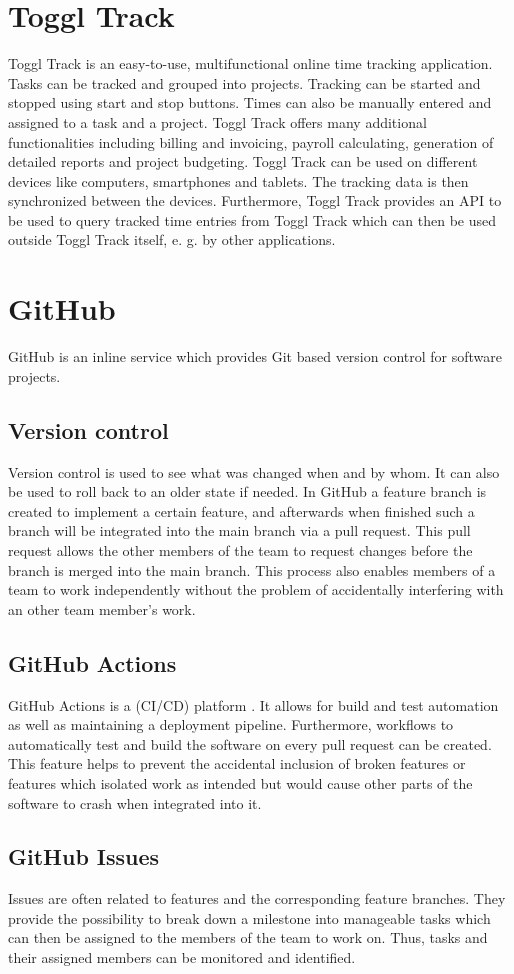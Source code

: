 \section{Toggl Track}
Toggl Track is an easy-to-use, multifunctional online time tracking application. Tasks can be tracked and grouped
into projects. Tracking can be started and stopped using start and stop buttons. Times can also be manually entered
and assigned to a task and a project. Toggl Track offers many additional functionalities including billing and invoicing,
payroll calculating, generation of detailed reports and project budgeting. Toggl Track can be used on different devices 
like computers, smartphones and tablets. The tracking data is then synchronized between the devices. Furthermore, Toggl 
Track provides an API to be used to query tracked time entries from Toggl Track which can then be used outside Toggl Track 
itself, e. g. by other applications. \cite{bachelorarbeit_Egger_Verstappen_page8} \cite{toggl_track_url}

\section{GitHub} \label{GitHub}
GitHub \cite{github_url} is an inline service which provides Git \cite{git_url} based version control for software projects.
\subsection{Version control} \label{Version control}
Version control is used to see what was changed when and by whom. It can also be used to roll back to an older state if needed. In GitHub a feature branch is created to implement a certain feature, and afterwards when finished such a branch will be integrated into the main branch via a pull request. This pull request allows the other members of the team to request changes before the branch is merged into the main branch. This process also enables members of a team to work independently without the problem of accidentally interfering with an other team member's work.
\subsection{GitHub Actions} \label{GitHub Actions}
GitHub Actions is a (CI/CD) platform \cite{github_actions_url}. It allows for build and test automation as well as maintaining a deployment pipeline. Furthermore, workflows to automatically test and build the software on every pull request can be created. This feature helps to prevent the accidental inclusion of broken features or features which isolated work as intended but would cause other parts of the software to crash when integrated into it.
\subsection{GitHub Issues} \label{GitHub Issues}
Issues are often related to features and the corresponding feature branches. They provide the possibility to break down a milestone into manageable tasks which can then be assigned to the members of the team to work on. Thus, tasks and their assigned members can be monitored and identified. 
